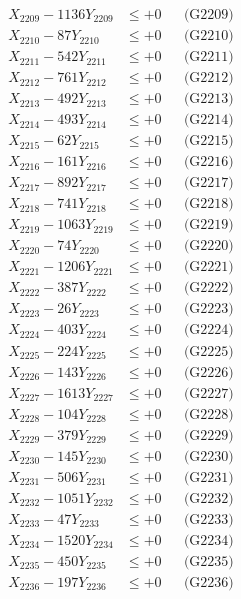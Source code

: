 \documentclass[a4paper,10pt]{article}
\begin{document}
{\begin{align}
X_{2209} - 1136Y_{2209} &\leq +0 && \text{(G2209)} \\
X_{2210} - 87Y_{2210} &\leq +0 && \text{(G2210)} \\
\allowbreak
X_{2211} - 542Y_{2211} &\leq +0 && \text{(G2211)} \\
X_{2212} - 761Y_{2212} &\leq +0 && \text{(G2212)} \\
X_{2213} - 492Y_{2213} &\leq +0 && \text{(G2213)} \\
X_{2214} - 493Y_{2214} &\leq +0 && \text{(G2214)} \\
X_{2215} - 62Y_{2215} &\leq +0 && \text{(G2215)} \\
X_{2216} - 161Y_{2216} &\leq +0 && \text{(G2216)} \\
X_{2217} - 892Y_{2217} &\leq +0 && \text{(G2217)} \\
X_{2218} - 741Y_{2218} &\leq +0 && \text{(G2218)} \\
X_{2219} - 1063Y_{2219} &\leq +0 && \text{(G2219)} \\
X_{2220} - 74Y_{2220} &\leq +0 && \text{(G2220)} \\
\allowbreak
X_{2221} - 1206Y_{2221} &\leq +0 && \text{(G2221)} \\
X_{2222} - 387Y_{2222} &\leq +0 && \text{(G2222)} \\
X_{2223} - 26Y_{2223} &\leq +0 && \text{(G2223)} \\
X_{2224} - 403Y_{2224} &\leq +0 && \text{(G2224)} \\
X_{2225} - 224Y_{2225} &\leq +0 && \text{(G2225)} \\
X_{2226} - 143Y_{2226} &\leq +0 && \text{(G2226)} \\
X_{2227} - 1613Y_{2227} &\leq +0 && \text{(G2227)} \\
X_{2228} - 104Y_{2228} &\leq +0 && \text{(G2228)} \\
X_{2229} - 379Y_{2229} &\leq +0 && \text{(G2229)} \\
X_{2230} - 145Y_{2230} &\leq +0 && \text{(G2230)} \\
\allowbreak
X_{2231} - 506Y_{2231} &\leq +0 && \text{(G2231)} \\
X_{2232} - 1051Y_{2232} &\leq +0 && \text{(G2232)} \\
X_{2233} - 47Y_{2233} &\leq +0 && \text{(G2233)} \\
X_{2234} - 1520Y_{2234} &\leq +0 && \text{(G2234)} \\
X_{2235} - 450Y_{2235} &\leq +0 && \text{(G2235)} \\
X_{2236} - 197Y_{2236} &\leq +0 && \text{(G2236)} \\

\end{align}}
\end{document}
